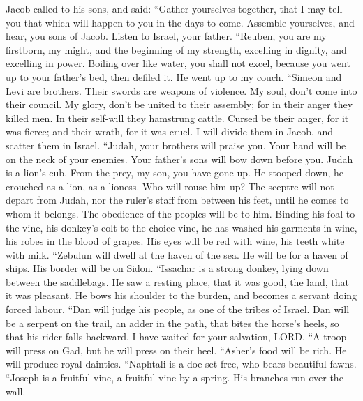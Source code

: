  Jacob called to his sons, and said: ``Gather yourselves
together, that I may tell you that which will happen to you in the days
to come.  Assemble yourselves, and hear, you sons of Jacob.
Listen to Israel, your father.  ``Reuben, you are my
firstborn, my might, and the beginning of my strength, excelling in
dignity, and excelling in power.  Boiling over like water,
you shall not excel, because you went up to your father's bed, then
defiled it. He went up to my couch.  ``Simeon and Levi are
brothers. Their swords are weapons of violence.  My soul,
don't come into their council. My glory, don't be united to their
assembly; for in their anger they killed men. In their self-will they
hamstrung cattle.  Cursed be their anger, for it was fierce;
and their wrath, for it was cruel. I will divide them in Jacob, and
scatter them in Israel.  ``Judah, your brothers will praise
you. Your hand will be on the neck of your enemies. Your father's sons
will bow down before you.  Judah is a lion's cub. From the
prey, my son, you have gone up. He stooped down, he crouched as a lion,
as a lioness. Who will rouse him up?  The sceptre will not
depart from Judah, nor the ruler's staff from between his feet, until he
comes to whom it belongs. The obedience of the peoples will be to him.
 Binding his foal to the vine, his donkey's colt to the
choice vine, he has washed his garments in wine, his robes in the blood
of grapes.  His eyes will be red with wine, his teeth white
with milk.  ``Zebulun will dwell at the haven of the sea.
He will be for a haven of ships. His border will be on Sidon.
 ``Issachar is a strong donkey, lying down between the
saddlebags.  He saw a resting place, that it was good, the
land, that it was pleasant. He bows his shoulder to the burden, and
becomes a servant doing forced labour.  ``Dan will judge
his people, as one of the tribes of Israel.  Dan will be a
serpent on the trail, an adder in the path, that bites the horse's
heels, so that his rider falls backward.  I have waited for
your salvation, LORD.  ``A troop will press on Gad, but he
will press on their heel.  ``Asher's food will be rich. He
will produce royal dainties.  ``Naphtali is a doe set free,
who bears beautiful fawns.  ``Joseph is a fruitful vine, a
fruitful vine by a spring. His branches run over the wall. 
